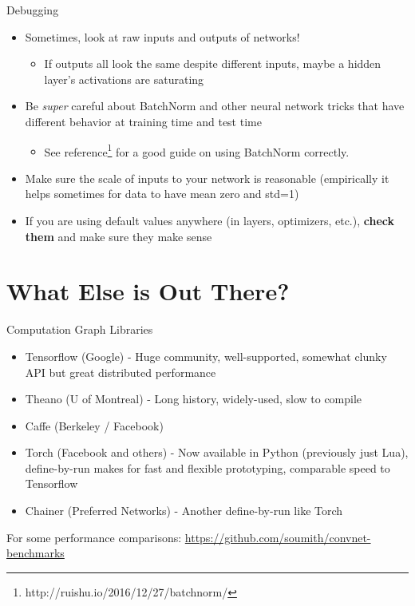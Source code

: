 \documentclass[]{beamer}
\begin{document}
\begin{frame}{Debugging}
\begin{itemize}
\item Sometimes, look at raw inputs and outputs of networks!
\begin{itemize}
\item If outputs all look the same despite different inputs, maybe a hidden layer's activations are saturating
\end{itemize}
\item Be \textit{super} careful about BatchNorm and other neural network tricks that have different behavior at training time and test time
\begin{itemize}
\item See reference\footnote{http://ruishu.io/2016/12/27/batchnorm/} for a good guide on using BatchNorm correctly.
\end{itemize}
\item Make sure the scale of inputs to your network is reasonable (empirically it helps sometimes for data to have mean zero and std=1)
\item If you are using default values anywhere (in layers, optimizers, etc.), \textbf{check them} and make sure they make sense
\end{itemize}
\end{frame}


\section{What Else is Out There?}

\begin{frame}{Computation Graph Libraries}

\begin{itemize}
\item Tensorflow (Google) - Huge community, well-supported, somewhat clunky API but great distributed performance
\item Theano (U of Montreal) - Long history, widely-used, slow to compile
\item Caffe (Berkeley / Facebook)
\item Torch (Facebook and others) - Now available in Python (previously just Lua), define-by-run makes for fast and flexible prototyping, comparable speed to Tensorflow
\item Chainer (Preferred Networks) - Another define-by-run like Torch
\end{itemize}

For some performance comparisons:
\url{https://github.com/soumith/convnet-benchmarks}


\end{frame}
\end{document}
